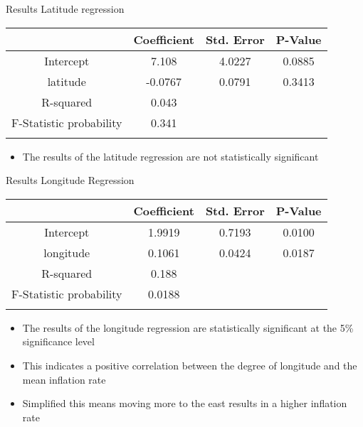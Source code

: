 \documentclass[10pt]{beamer}
\begin{document}
\begin{frame}{Results Latitude regression}
  \centering
  \begin{tabular}{cccc}
      \hline
      {} &  Coefficient &  Std. Error &   P-Value \\
      \hline  
      Intercept &     7.108 &    4.0227 &  0.0885 \\
      latitude  &    -0.0767 &    0.0791 &  0.3413 \\
      \hline
      R-squared     &     0.043\\
      F-Statistic probability &   0.341\\
      \hline
      \vspace{1em}
      \end{tabular}
      
  
  \begin{itemize}
      \item The results of the latitude regression are not statistically significant
  \end{itemize}

\end{frame}


\begin{frame}{Results Longitude Regression}
  \centering
  \begin{tabular}{cccc}
      \hline
      {} &  Coefficient &  Std. Error &   P-Value \\
      \hline
      Intercept &     1.9919 &    0.7193 &  0.0100 \\
      longitude &     0.1061 &    0.0424 &  0.0187 \\
      \hline
      R-squared     &     0.188\\
      F-Statistic probability &   0.0188\\
      \hline
      \vspace{1em}
      \end{tabular}

  \begin{itemize}
      \item The results of the longitude regression are statistically significant at the 5\% significance level
      \item This indicates a positive correlation between the degree of longitude and the mean inflation rate
      \item Simplified this means moving more to the east results in a higher inflation rate
  \end{itemize}
  
\end{frame}
\end{document}
